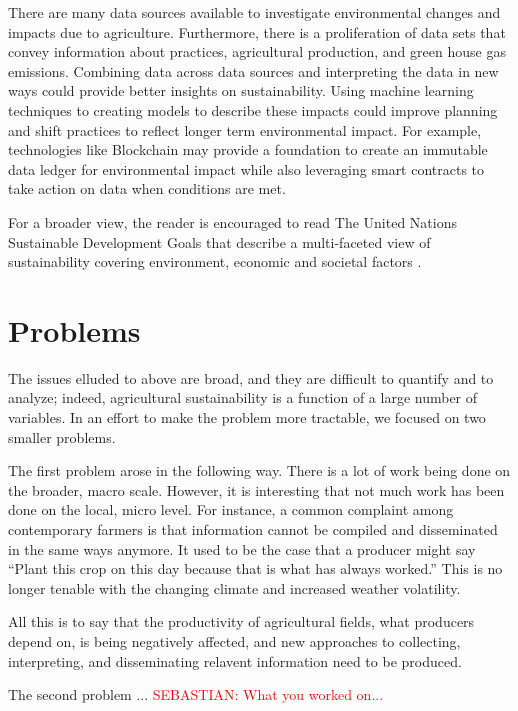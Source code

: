 \documentclass[11pt]{article}
\numberwithin{equation}{section}
\newcommand{\rred}[1]{\textcolor{red}{#1}}
\begin{document}
There are many data sources available to investigate environmental changes and impacts due to agriculture. Furthermore, there is a proliferation of data sets that convey information about practices, agricultural production, and green house gas emissions. Combining data across data sources and interpreting the data in new ways could provide better insights on sustainability. Using machine learning techniques to creating models to describe these impacts could improve planning and shift practices to reflect longer term environmental impact. For example, technologies like Blockchain may provide a foundation to create an immutable data ledger for environmental impact while also leveraging smart contracts to take action on data when conditions are met.

For a broader view, the reader is encouraged to read The United Nations Sustainable Development Goals that describe a multi-faceted view of sustainability covering environment, economic and societal factors \cite{UN-edgar}.


\section{Problems}\label{problems}

The issues elluded to above are broad, and they are difficult to quantify and to analyze; indeed, agricultural sustainability is a function of a large number of variables. In an effort to make the problem more tractable, we focused on two smaller problems.

The first problem arose in the following way. There is a lot of work being done on the broader, macro scale. However, it is interesting that not much work has been done on the local, micro level. For instance, a common complaint among contemporary farmers is that information cannot be compiled and disseminated in the same ways anymore. It used to be the case that a producer might say ``Plant this crop on this day because that is what has always worked.'' This is no longer tenable with the changing climate and increased weather volatility.

All this is to say that the productivity of agricultural fields, what producers depend on, is being negatively affected, and new approaches to collecting, interpreting, and disseminating relavent information need to be produced.

The second problem ... \rred{SEBASTIAN: What you worked on...}
\end{document}
